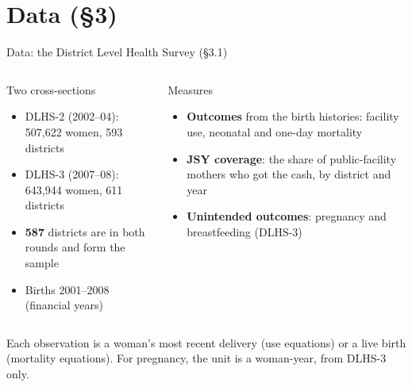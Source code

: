 \documentclass[aspectratio=169,11pt]{beamer}
\newcommand{\kn}[1]{{\color{jsyred}\bfseries #1}}
\begin{document}
\section{Data (\S3)}
\begin{frame}{Data: the District Level Health Survey (\S3.1)}
  \begin{columns}[T]
    \begin{block}{Two cross-sections}
      \begin{itemize}
        \item DLHS-2 (2002--04): 507{,}622 women, 593 districts
        \item DLHS-3 (2007--08): 643{,}944 women, 611 districts
        \item \kn{587} districts are in both rounds and form the sample
        \item Births 2001--2008 (financial years)
      \end{itemize}
    \end{block}
    \begin{block}{Measures}
      \begin{itemize}
        \item \textbf{Outcomes} from the birth histories: facility use, neonatal and one-day mortality
        \item \textbf{JSY coverage}: the share of public-facility mothers who got the cash, by district and year
        \item \textbf{Unintended outcomes}: pregnancy and breastfeeding (DLHS-3)
      \end{itemize}
    \end{block}
  \end{columns}
  \vspace{0.3em}
  \footnotesize Each observation is a woman's most recent delivery (use equations) or a live birth (mortality equations). For pregnancy, the unit is a woman-year, from DLHS-3 only.
\end{frame}
\end{document}
